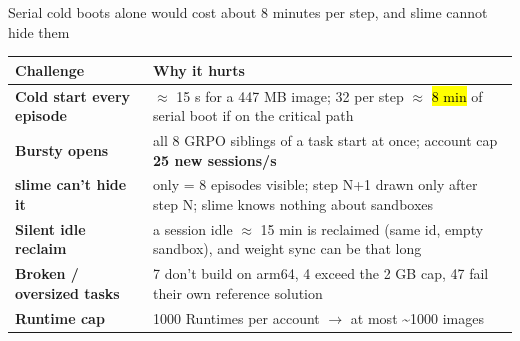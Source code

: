\begin{frame}{Serial cold boots alone would cost about 8 minutes per step, and slime cannot hide them}
\footnotesize\renewcommand{\arraystretch}{1.08}
\begin{tabularx}{\textwidth}{@{}p{} Y@{}}
\toprule
\textbf{Challenge} & \textbf{Why it hurts}\\
\midrule
\textbf{Cold start every episode} & $\approx$ 15 s for a 447 MB image; 32 per step $\approx$ \hl{8 min} of serial boot if on the critical path\\
\textbf{Bursty opens} & all 8 GRPO siblings of a task start at once; account cap \textbf{25 new sessions/s}\\
\textbf{slime can't hide it} & only  = 8 episodes visible; step N+1 drawn only after step N; slime knows nothing about sandboxes\\
\textbf{Silent idle reclaim} & a session idle $\approx$ 15 min is reclaimed (same id, empty sandbox), and weight sync can be that long\\
\textbf{Broken / oversized tasks} & 7 don't build on arm64, 4 exceed the 2 GB cap, 47 fail their own reference solution\\
\textbf{Runtime cap} & 1000 Runtimes per account $\rightarrow$ at most \textasciitilde1000 images\\
\bottomrule
\end{tabularx}
\end{frame}

